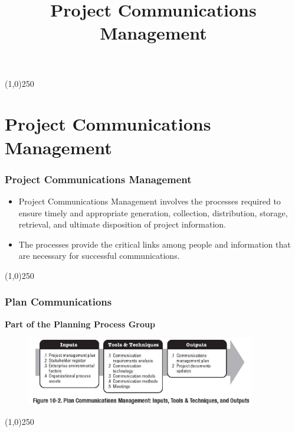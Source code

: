 




\title[Project Management]{Project Communications Management}




%
\usetikzlibrary{arrows}

\tableofcontents
\newpage



\begin{frame}
\titlepage
\end{frame}\begin{center}\line(1,0){250}\end{center}
%
%


\section{Project Communications Management}



\begin{frame}
\frametitle{Project Communications Management}
\begin{itemize}
	\item Project Communications Management involves the processes required to ensure timely and appropriate generation, collection, distribution, storage, retrieval, and ultimate disposition of project information.
	\item The processes provide the critical links among people and information that are necessary for successful communications.
\end{itemize}
\end{frame}\begin{center}\line(1,0){250}\end{center}


\begin{frame}
\frametitle{Plan Communications}
\textbf{Part of the Planning Process Group}
\begin{figure}
	\centering
		\includegraphics[width = 10cm]{images/Fig10-2.jpg}
	\label{fig:10-2}
\end{figure}
\end{frame}\begin{center}\line(1,0){250}\end{center}



